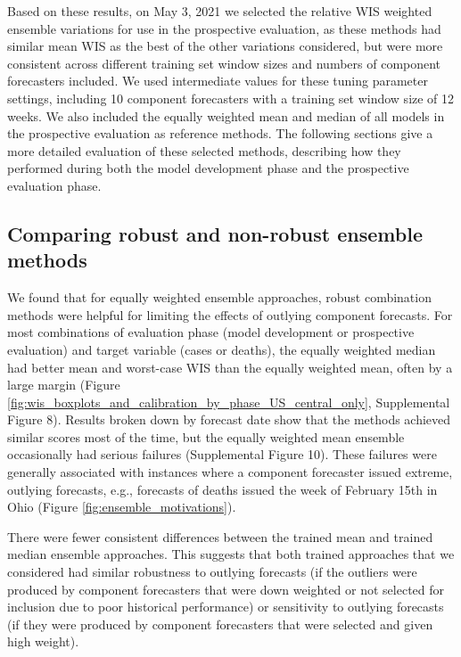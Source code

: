 \documentclass[11pt,3p,authoryear]{elsarticle}
\begin{document}
Based on these results, on May 3, 2021 we selected the relative WIS weighted ensemble variations for use in the prospective evaluation, as these methods had similar mean WIS as the best of the other variations considered, but were more consistent across different training set window sizes and numbers of component forecasters included. We used intermediate values for these tuning parameter settings, including 10 component forecasters with a training set window size of 12 weeks. We also included the equally weighted mean and median of all models in the prospective evaluation as reference methods. The following sections give a more detailed evaluation of these selected methods, describing how they performed during both the model development phase and the prospective evaluation phase.

\subsection{Comparing robust and non-robust ensemble methods}
\label{subsec:results_robust}

We found that for equally weighted ensemble approaches, robust combination methods were helpful for limiting the effects of outlying component forecasts. For most combinations of evaluation phase (model development or prospective evaluation) and target variable (cases or deaths), the equally weighted median had better mean and worst-case WIS than the equally weighted mean, often by a large margin (Figure \ref{fig:wis_boxplots_and_calibration_by_phase_US_central_only}, Supplemental Figure 8). Results broken down by forecast date show that the methods achieved similar scores most of the time, but the equally weighted mean ensemble occasionally had serious failures (Supplemental Figure 10). These failures were generally associated with instances where a component forecaster issued extreme, outlying forecasts, e.g., forecasts of deaths issued the week of February 15th in Ohio (Figure \ref{fig:ensemble_motivations}).

There were fewer consistent differences between the trained mean and trained median ensemble approaches. This suggests that both trained approaches that we considered had similar robustness to outlying forecasts (if the outliers were produced by component forecasters that were down weighted or not selected for inclusion due to poor historical performance) or sensitivity to outlying forecasts (if they were produced by component forecasters that were selected and given high weight).
\end{document}
